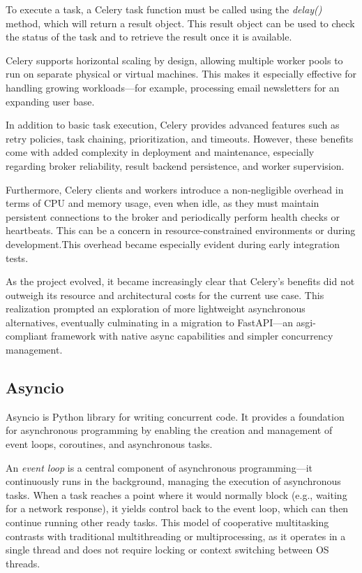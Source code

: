 To execute a task, a Celery task function must be called using the \textit{delay()} method, which will return a result object. 
This result object can be used to check the status of the task and to retrieve the result once it is available.

Celery supports horizontal scaling by design, allowing multiple worker pools to run on separate physical or virtual machines. 
This makes it especially effective for handling growing workloads—for example, processing email newsletters for an expanding 
user base.

In addition to basic task execution, Celery provides advanced features such as retry policies, task chaining, prioritization, 
and timeouts. However, these benefits come with added complexity in deployment and maintenance, especially regarding broker 
reliability, result backend persistence, and worker supervision.

Furthermore, Celery clients and workers introduce a non-negligible overhead in terms of CPU and memory usage, even when 
idle, as they must maintain persistent connections to the broker and periodically perform health checks or heartbeats. 
This can be a concern in resource-constrained environments or during development.This overhead became especially evident 
during early integration tests.

As the project evolved, it became increasingly clear that Celery's benefits did not outweigh its resource and 
architectural costs for the current use case. This realization prompted an exploration of more lightweight asynchronous 
alternatives, eventually culminating in a migration to FastAPI—an \ac{asgi}-compliant framework with native async capabilities 
and simpler concurrency management.

\subsection{Asyncio}

Asyncio is Python library for writing concurrent code. It provides a foundation for asynchronous programming by enabling 
the creation and management of event loops, coroutines, and asynchronous tasks.

An \textit{event loop} is a central component of asynchronous programming—it continuously runs in the background, managing 
the execution of asynchronous tasks. When a task reaches a point where it would normally block (e.g., waiting for a network 
response), it yields control back to the event loop, which can then continue running other ready tasks. This model of 
cooperative multitasking contrasts with traditional multithreading or multiprocessing, as it operates in a single thread 
and does not require locking or context switching between OS threads.

